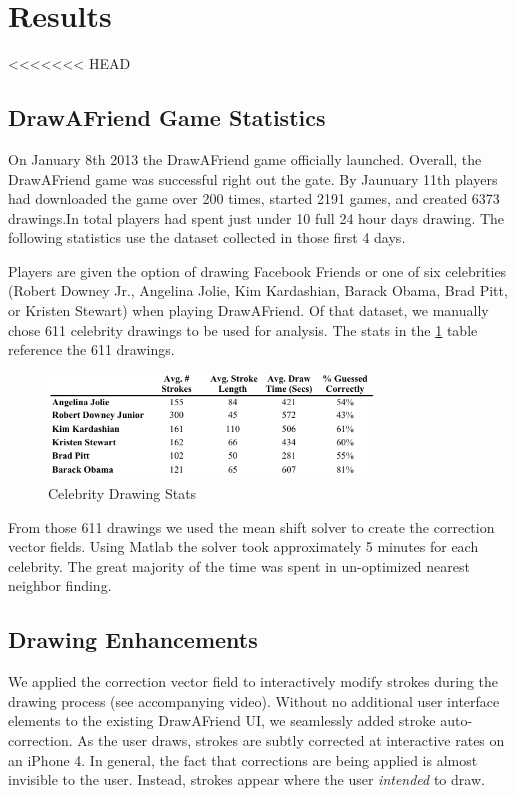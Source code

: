 \section{Results}
<<<<<<< HEAD

\subsection{DrawAFriend Game Statistics}

On January 8th 2013 the DrawAFriend game officially launched. Overall, the DrawAFriend game was successful right out the gate. By Jaunuary 11th players had downloaded the game over 200 times, started 2191 games, and created 6373 drawings.In total players had spent just under 10 full 24 hour days drawing. The following statistics use the dataset collected in those first 4 days.

Players are given the option of drawing Facebook Friends or one of six celebrities (Robert Downey Jr., Angelina Jolie, Kim Kardashian, Barack Obama, Brad Pitt, or Kristen Stewart) when playing DrawAFriend. Of that dataset, we manually chose 611 celebrity drawings to be used for analysis. The stats in the \ref{fig:daf-stats} table reference the 611 drawings.

\begin{figure}[b]
  \centering%
\includegraphics[height=1.1in]{./figures/daf-stats-cropped.pdf}
  \caption{Celebrity Drawing Stats}
  \label{fig:daf-stats}
\end{figure}

From those 611 drawings we used the mean shift solver to create the correction vector fields. Using Matlab the solver took approximately 5 minutes for each celebrity. The great majority of the time was spent in un-optimized nearest neighbor finding.

\subsection {Drawing Enhancements}

We applied the correction vector field to interactively modify strokes during the drawing process (see accompanying video). Without no additional user interface elements to the existing DrawAFriend UI, we seamlessly added stroke auto-correction. As the user draws, strokes are subtly corrected at interactive rates on an iPhone 4. In general, the fact that corrections are being applied is almost invisible to the user. Instead, strokes appear where the user {\em intended} to draw. 

